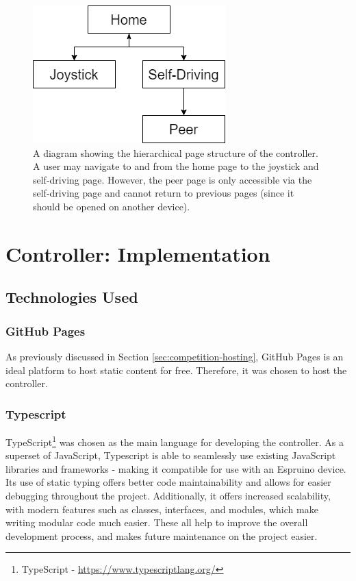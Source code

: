 \documentclass{l4proj}
\begin{document}
\begin{figure}[!ht]
    \centering
    \includegraphics[width=0.45\linewidth]{images/page-structure.png}
    \caption{A diagram showing the hierarchical page structure of the controller. A user may navigate to and from the home page to the joystick and self-driving page. However, the peer page is only accessible via the self-driving page and cannot return to previous pages (since it should be opened on another device).}
    \label{fig:page-structure}
\end{figure}


\chapter{Controller: Implementation}

\section{Technologies Used}
\subsection{GitHub Pages}
As previously discussed in Section \ref{sec:competition-hosting}, GitHub Pages is an ideal platform to host static content for free. Therefore, it was chosen to host the controller.

\subsection{Typescript}
TypeScript\footnote{TypeScript - \url{https://www.typescriptlang.org/}} was chosen as the main language for developing the controller. As a superset of JavaScript, Typescript is able to seamlessly use existing JavaScript libraries and frameworks - making it compatible for use with an Espruino device. Its use of static typing offers better code maintainability and allows for easier debugging throughout the project. Additionally, it offers increased scalability, with modern features such as classes, interfaces, and modules, which make writing modular code much easier. These all help to improve the overall development process, and makes future maintenance on the project easier.
\end{document}
